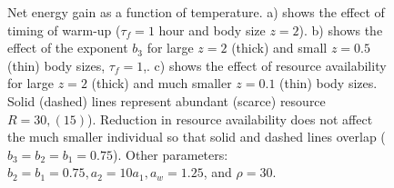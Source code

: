 \begin{figure}%
\begin{center}
\caption{
	Net energy gain as a function of temperature.
	a) shows the effect of timing of warm-up ($\tau_f = 1$ hour and body size $z = 2$). %
	b) shows the effect of the exponent $b_3$  for large $z= 2$ (thick) and small $z = 0.5$ (thin) body sizes, $\tau_f = 1$,.
	c) shows the effect of resource availability for large $z = 2$ (thick) and much smaller $z = 0.1$ (thin) body sizes.
	Solid (dashed) lines represent abundant (scarce) resource $R = 30, (15)$).
	Reduction in resource availability does not affect the much smaller individual so that solid and dashed lines overlap ($b_3 = b_2 = b_1 = 0.75$).
	Other parameters: $ b_2 = b_1  = 0.75,  a_2 = 10 a_1, a_w = 1.25$, and  $\rho = 30$.
}%
\label{fig6}
\end{center}
\end{figure}
